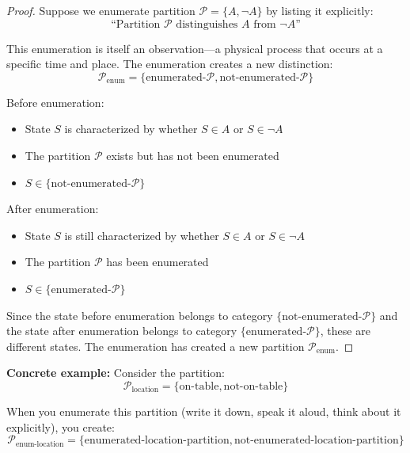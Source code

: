 \documentclass[twocolumn,10pt]{article}
\theoremstyle{definition}
\theoremstyle{remark}
\begin{document}
\begin{proof}
Suppose we enumerate partition $\mathcal{P} = \{A, \neg A\}$ by listing it explicitly:
\begin{equation}
\text{``Partition } \mathcal{P} \text{ distinguishes } A \text{ from } \neg A\text{''}
\end{equation}

This enumeration is itself an observation—a physical process that occurs at a specific time and place. The enumeration creates a new distinction:
\begin{equation}
\mathcal{P}_{\text{enum}} = \{\text{enumerated-}\mathcal{P}, \text{not-enumerated-}\mathcal{P}\}
\end{equation}

Before enumeration:
\begin{itemize}
\item State $S$ is characterized by whether $S \in A$ or $S \in \neg A$
\item The partition $\mathcal{P}$ exists but has not been enumerated
\item $S \in \{\text{not-enumerated-}\mathcal{P}\}$
\end{itemize}

After enumeration:
\begin{itemize}
\item State $S$ is still characterized by whether $S \in A$ or $S \in \neg A$
\item The partition $\mathcal{P}$ has been enumerated
\item $S \in \{\text{enumerated-}\mathcal{P}\}$
\end{itemize}

Since the state before enumeration belongs to category $\{\text{not-enumerated-}\mathcal{P}\}$ and the state after enumeration belongs to category $\{\text{enumerated-}\mathcal{P}\}$, these are different states. The enumeration has created a new partition $\mathcal{P}_{\text{enum}}$.
\end{proof}

\noindent\textbf{Concrete example:} Consider the partition:
\begin{equation}
\mathcal{P}_{\text{location}} = \{\text{on-table}, \text{not-on-table}\}
\end{equation}

When you enumerate this partition (write it down, speak it aloud, think about it explicitly), you create:
\begin{equation}
\mathcal{P}_{\text{enum-location}} = \{\text{enumerated-location-partition}, \text{not-enumerated-location-partition}\}
\end{equation}
\end{document}
